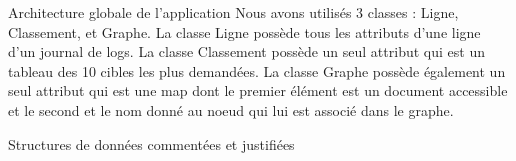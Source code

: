 \documentclass{article}
\begin{document}
\begin{section}{Architecture globale de l'application}
Nous avons utilisés 3 classes : Ligne, Classement, et Graphe. La classe Ligne possède tous les attributs d'une ligne d'un journal de logs. La classe Classement possède un seul attribut qui est un tableau des 10 cibles les plus demandées. La classe Graphe possède également un seul attribut qui est une map dont le premier élément est un document accessible et le second et le nom donné au noeud qui lui est associé dans le graphe.
\end{section}


\begin{section}{Structures de données commentées et justifiées}

\end{section}
\end{document}
